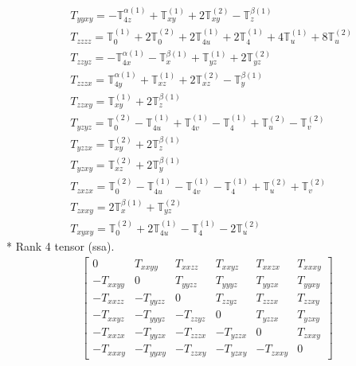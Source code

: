 \documentclass[fleqn,8pt,landscape]{jsarticle}
\begin{document}
\begin{align*}
& T_{yyxy} = - \mathbb{T}_{4z}^{\alpha(1)} + \mathbb{T}_{xy}^{(1)} + 2 \mathbb{T}_{xy}^{(2)} - \mathbb{T}_{z}^{\beta(1)} \\
& T_{zzzz} = \mathbb{T}_{0}^{(1)} + 2 \mathbb{T}_{0}^{(2)} + 2 \mathbb{T}_{4u}^{(1)} + 2 \mathbb{T}_{4}^{(1)} + 4 \mathbb{T}_{u}^{(1)} + 8 \mathbb{T}_{u}^{(2)} \\
& T_{zzyz} = - \mathbb{T}_{4x}^{\alpha(1)} - \mathbb{T}_{x}^{\beta(1)} + \mathbb{T}_{yz}^{(1)} + 2 \mathbb{T}_{yz}^{(2)} \\
& T_{zzzx} = \mathbb{T}_{4y}^{\alpha(1)} + \mathbb{T}_{xz}^{(1)} + 2 \mathbb{T}_{xz}^{(2)} - \mathbb{T}_{y}^{\beta(1)} \\
& T_{zzxy} = \mathbb{T}_{xy}^{(1)} + 2 \mathbb{T}_{z}^{\beta(1)} \\
& T_{yzyz} = \mathbb{T}_{0}^{(2)} - \mathbb{T}_{4u}^{(1)} + \mathbb{T}_{4v}^{(1)} - \mathbb{T}_{4}^{(1)} + \mathbb{T}_{u}^{(2)} - \mathbb{T}_{v}^{(2)} \\
& T_{yzzx} = \mathbb{T}_{xy}^{(2)} + 2 \mathbb{T}_{z}^{\beta(1)} \\
& T_{yzxy} = \mathbb{T}_{xz}^{(2)} + 2 \mathbb{T}_{y}^{\beta(1)} \\
& T_{zxzx} = \mathbb{T}_{0}^{(2)} - \mathbb{T}_{4u}^{(1)} - \mathbb{T}_{4v}^{(1)} - \mathbb{T}_{4}^{(1)} + \mathbb{T}_{u}^{(2)} + \mathbb{T}_{v}^{(2)} \\
& T_{zxxy} = 2 \mathbb{T}_{x}^{\beta(1)} + \mathbb{T}_{yz}^{(2)} \\
& T_{xyxy} = \mathbb{T}_{0}^{(2)} + 2 \mathbb{T}_{4u}^{(1)} - \mathbb{T}_{4}^{(1)} - 2 \mathbb{T}_{u}^{(2)}
\end{align*}
* Rank 4 tensor (ssa).
\begin{align*}
\begin{bmatrix} 0 & T_{xxyy} & T_{xxzz} & T_{xxyz} & T_{xxzx} & T_{xxxy} \\ - T_{xxyy} & 0 & T_{yyzz} & T_{yyyz} & T_{yyzx} & T_{yyxy} \\ - T_{xxzz} & - T_{yyzz} & 0 & T_{zzyz} & T_{zzzx} & T_{zzxy} \\ - T_{xxyz} & - T_{yyyz} & - T_{zzyz} & 0 & T_{yzzx} & T_{yzxy} \\ - T_{xxzx} & - T_{yyzx} & - T_{zzzx} & - T_{yzzx} & 0 & T_{zxxy} \\ - T_{xxxy} & - T_{yyxy} & - T_{zzxy} & - T_{yzxy} & - T_{zxxy} & 0 \end{bmatrix}
\end{align*}
\end{document}
